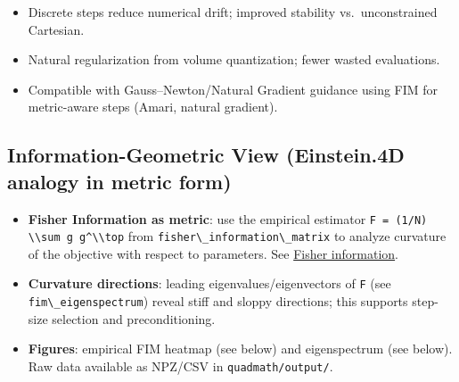 \documentclass[
  10pt,
]{article}
\newcommand{\passthrough}[1]{#1}
\providecommand{\tightlist}{%
  \setlength{\itemsep}{0pt}\setlength{\parskip}{0pt}}
\begin{document}
\begin{itemize}
\tightlist
\item
  Discrete steps reduce numerical drift; improved stability
  vs.~unconstrained Cartesian.
\item
  Natural regularization from volume quantization; fewer wasted
  evaluations.
\item
  Compatible with Gauss--Newton/Natural Gradient guidance using FIM for
  metric-aware steps (Amari, natural gradient).
\end{itemize}

\hypertarget{information-geometric-view-einstein.4d-analogy-in-metric-form}{%
\subsection{Information-Geometric View (Einstein.4D analogy in metric
form)}\label{information-geometric-view-einstein.4d-analogy-in-metric-form}}

\begin{itemize}
\tightlist
\item
  \textbf{Fisher Information as metric}: use the empirical estimator
  \passthrough{\lstinline!F = (1/N) \\sum g g^\\top!} from
  \passthrough{\lstinline!fisher\_information\_matrix!} to analyze
  curvature of the objective with respect to parameters. See
  \href{https://en.wikipedia.org/wiki/Fisher_information}{Fisher
  information}.
\item
  \textbf{Curvature directions}: leading eigenvalues/eigenvectors of
  \passthrough{\lstinline!F!} (see
  \passthrough{\lstinline!fim\_eigenspectrum!}) reveal stiff and sloppy
  directions; this supports step-size selection and preconditioning.
\item
  \textbf{Figures}: empirical FIM heatmap (see below) and eigenspectrum
  (see below). Raw data available as NPZ/CSV in
  \passthrough{\lstinline!quadmath/output/!}.
\end{itemize}
\end{document}
